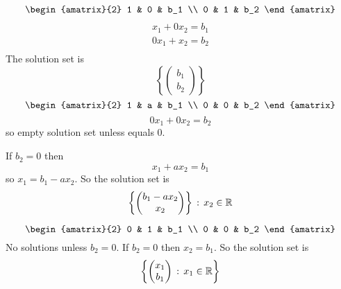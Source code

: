 \documentclass[10pt, a4paper]{article}
\begin{document}
\begin{example}
    \[
    \begin{amatrix}{2}
        1 & 0 & b_1 \\
        0 & 1 & b_2
    \end{amatrix}
    \]
    \begin{gather*}
        x_1 + 0x_2 = b_1 \\
        0x_1 + x_2 = b_2 \\
    \end{gather*}
    The solution set is
    \[
    \left\{\begin{pmatrix}
        b_1 \\ b_2
    \end{pmatrix}\right\}
    \]
    \[ 
    \begin{amatrix}{2}
        1 & a & b_1 \\
        0 & 0 & b_2
    \end{amatrix}
    \]
    \[
    0x_1 + 0x_2 = b_2
    \]
    so empty solution set unless equals $0$.

    If $b_2 = 0$ then
    \[
    x_1 + ax_2 = b_1
    \]
    so $x_1 = b_1 - ax_2$.
    So the solution set is
    \[
    \left\{\begin{pmatrix}
        b_1 - ax_2 \\ x_2
    \end{pmatrix}\right\}
    \,:\,
    x_2 \in \mathbb{R}
    \]

    \[
    \begin{amatrix}{2}
        0 & 1 & b_1 \\
        0 & 0 & b_2
    \end{amatrix}
    \]
    No solutions unless $b_2 = 0$.
    If $b_2 = 0$ then $x_2 = b_1$.
    So the solution set is
    \[
    \left\{\begin{pmatrix}
        x_1 \\ b_1
    \end{pmatrix} \,:\, x_1 \in \mathbb{R}\right\}
    \]
\end{example}
\end{document}
